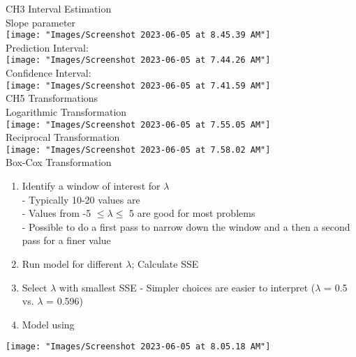 \documentclass[17pt]{extarticle}%
\begin{document}
	\pagestyle{empty}
	\color{MidnightBlue}%
	\ECFJD
	\small
	
%

%

\clearpage
{\Large CH3 Interval Estimation} \\
%
Slope parameter \\
\texttt{[image: "Images/Screenshot 2023-06-05 at 8.45.39 AM"]} \\
Prediction Interval: \\
\texttt{[image: "Images/Screenshot 2023-06-05 at 7.44.26 AM"]} \\
Confidence Interval: \\
\texttt{[image: "Images/Screenshot 2023-06-05 at 7.41.59 AM"]} \\

%

\clearpage
{\Large CH5 Transformations} \\
%
Logarithmic Transformation \\
\texttt{[image: "Images/Screenshot 2023-06-05 at 7.55.05 AM"]} \\
Reciprocal Transformation \\
\texttt{[image: "Images/Screenshot 2023-06-05 at 7.58.02 AM"]} \\
Box-Cox Transformation \\
\begin{enumerate}
\item Identify a window of interest for $\lambda$ \\
- Typically 10-20 values are  \\
- Values from -5 $\leq \lambda \leq$ 5 are good for most problems \\
- Possible to do a first pass to narrow down the window and a then a second pass for a finer value 
\item Run model for different $\lambda$; Calculate SSE 
\item Select $\lambda$ with smallest SSE 
- Simpler choices are easier to interpret ($\lambda$ = 0.5 vs. $\lambda$ = 0.596) 
\item Model using
\end{enumerate}
\texttt{[image: "Images/Screenshot 2023-06-05 at 8.05.18 AM"]} \\
\end{document}
